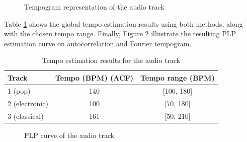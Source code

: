 \documentclass[
paper=A4,               %
pagesize=auto,          %
fontsize=12pt,          %
DIV=16,                 %
twoside=false,           %
BCOR=20mm,              %
parskip=false,          %
chapterprefix=true,     %
appendixprefix=true,    %
listof=totoc,           %
bibliography=totoc,     %
headinclude=true,       %
footinclude=false,      %
headsepline=false,       %
footsepline=false,      %
headings=small,         %
numbers=noenddot        %
] {scrbook}
\begin{document}
\begin{figure}[ht]
    \centering
    \caption{Tempogram representation of the audio track}
    \label{fig:tempogram}
\end{figure}
Table \ref{tab:results} shows the global tempo estimation results using both methods, along with the chosen tempo range. Finally, Figure \ref{fig:plp} illustrate the resulting PLP estimation curve on autocorrelation and Fourier tempogram.
\begin{table}
    \centering
    \begin{tabular}{l|c|c}
        \toprule
        \textbf{Track} & \textbf{Tempo (BPM) (ACF)} & \textbf{Tempo range (BPM)} \\
        \midrule
        1 (pop) & 140& [100, 180]\\
        2 (electronic)& 100& [70, 180]\\
        3 (classical)& 161& [50, 210]\\
        \bottomrule
    \end{tabular}
    \caption{Tempo estimation results for the audio track}
    \label{tab:results}
\end{table}
\begin{figure}[bht]
    \centering
    \caption{PLP curve of the audio track}
    \label{fig:plp}
\end{figure}
\end{document}
